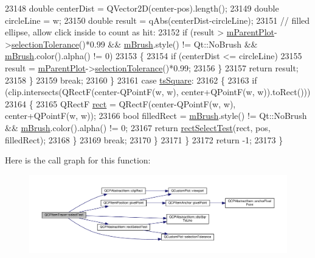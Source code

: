 \begin{DoxyCode}
23148         \textcolor{keywordtype}{double} centerDist = QVector2D(center-pos).length();
23149         \textcolor{keywordtype}{double} circleLine = w;
23150         \textcolor{keywordtype}{double} result = qAbs(centerDist-circleLine);
23151         \textcolor{comment}{// filled ellipse, allow click inside to count as hit:}
23152         \textcolor{keywordflow}{if} (result > \hyperlink{class_q_c_p_layerable_aa2a528433e44db02b8aef23c1f9f90ed}{mParentPlot}->\hyperlink{class_q_custom_plot_a7b738074c75e80070ef6a10263c6cd69}{selectionTolerance}()*0.99 && 
      \hyperlink{class_q_c_p_item_tracer_a6597be63a17a266233941354200b2340}{mBrush}.style() != Qt::NoBrush && \hyperlink{class_q_c_p_item_tracer_a6597be63a17a266233941354200b2340}{mBrush}.color().alpha() != 0)
23153         \{
23154           \textcolor{keywordflow}{if} (centerDist <= circleLine)
23155             result = \hyperlink{class_q_c_p_layerable_aa2a528433e44db02b8aef23c1f9f90ed}{mParentPlot}->\hyperlink{class_q_custom_plot_a7b738074c75e80070ef6a10263c6cd69}{selectionTolerance}()*0.99;
23156         \}
23157         \textcolor{keywordflow}{return} result;
23158       \}
23159       \textcolor{keywordflow}{break};
23160     \}
23161     \textcolor{keywordflow}{case} \hyperlink{class_q_c_p_item_tracer_a2f05ddb13978036f902ca3ab47076500a4ed5f01f2c5fd86d980366d79f481b9b}{tsSquare}:
23162     \{
23163       \textcolor{keywordflow}{if} (clip.intersects(QRectF(center-QPointF(w, w), center+QPointF(w, w)).toRect()))
23164       \{
23165         QRectF \hyperlink{_gen_blob_8m_aea8f6815d9a63491fc422c5572c6b3c3}{rect} = QRectF(center-QPointF(w, w), center+QPointF(w, w));
23166         \textcolor{keywordtype}{bool} filledRect = \hyperlink{class_q_c_p_item_tracer_a6597be63a17a266233941354200b2340}{mBrush}.style() != Qt::NoBrush && \hyperlink{class_q_c_p_item_tracer_a6597be63a17a266233941354200b2340}{mBrush}.color().alpha() != 0;
23167         \textcolor{keywordflow}{return} \hyperlink{class_q_c_p_abstract_item_a4c0e14c4e92df91174cb7183fb363069}{rectSelectTest}(rect, pos, filledRect);
23168       \}
23169       \textcolor{keywordflow}{break};
23170     \}
23171   \}
23172   \textcolor{keywordflow}{return} -1;
23173 \}
\end{DoxyCode}


Here is the call graph for this function\+:\nopagebreak
\begin{figure}[H]
\begin{center}
\leavevmode
\includegraphics[width=350pt]{class_q_c_p_item_tracer_ae71f3728421c83c188c117279ca050fd_cgraph}
\end{center}
\end{figure}


